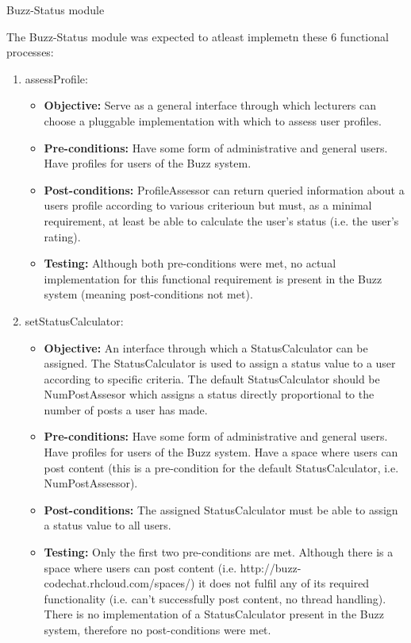 \item Buzz-Status module
	
The Buzz-Status module was expected to atleast implemetn these 6 functional processes:
	
\begin{enumerate}
	\item assessProfile:
	\begin{itemize}
		\item\textbf{Objective: } Serve as a general interface through which lecturers can choose a pluggable implementation with which to assess user profiles.
		\item\textbf{Pre-conditions: } Have some form of administrative and general users. Have profiles for users of the Buzz system. 
		\item\textbf{Post-conditions: } ProfileAssessor can return queried information about a users profile according to various criterioun but must, as a minimal requirement, at least be able to calculate the user’s status (i.e. the user’s rating).
		\item\textbf{Testing: } Although both pre-conditions were met, no actual implementation for this functional requirement is present in the Buzz system (meaning post-conditions not met).
	\end{itemize}
\item setStatusCalculator:
	\begin{itemize}
		\item\textbf{Objective: } An interface through which a StatusCalculator can be assigned. The StatusCalculator is used to assign a status value to a user according to specific criteria. The default StatusCalculator should be NumPostAssesor which assigns a status directly proportional to the number of posts a user has made.
		\item\textbf{Pre-conditions: } Have some form of administrative and general users. Have profiles for users of the Buzz system. Have a space where users can post content (this is a pre-condition for the default StatusCalculator, i.e. NumPostAssessor).
		\item\textbf{Post-conditions: } The assigned StatusCalculator must be able to assign a status value to all users.
		\item\textbf{Testing: } Only the first two pre-conditions are met. Although there is a space where users can post content (i.e. http://buzz-codechat.rhcloud.com/spaces/) it does not fulfil any of its required functionality (i.e. can’t successfully post content, no thread handling). There is no implementation of a StatusCalculator present in the Buzz system, therefore no post-conditions were met.

\end{itemize}
\end{enumerate}
